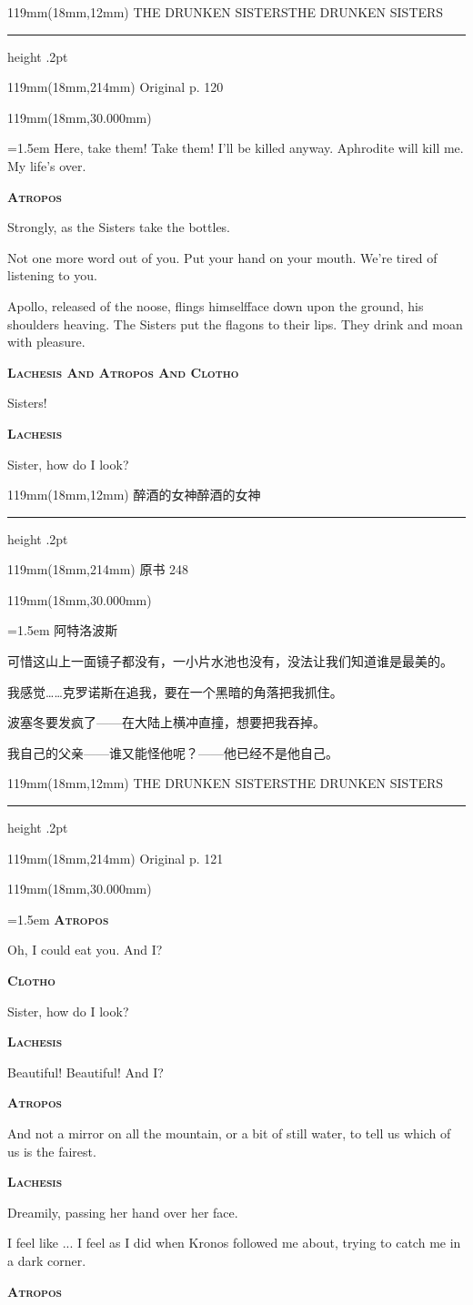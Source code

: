 \documentclass{article}
\newcommand{\ENsetup}{\normalfont\color{ink}\fontsize{11}{16.5}\selectfont\emergencystretch=1.5em}
\newcommand{\ZHsetup}{\normalfont\color{ink}\fontsize{10.5}{17}\selectfont\emergencystretch=1.5em}
\newcommand{\ENspeaker}[1]{{\fontsize{9.8}{13}\selectfont\scshape\bfseries #1}\par\vspace{3pt}}
\newcommand{\ZHspeaker}[1]{{\hei\fontsize{10.3}{13}\selectfont #1}\par\vspace{3pt}}
\newcommand{\Block}[3]{\begin{textblock*}{119mm}(18mm,#1mm){#2 #3\par}\end{textblock*}}
\newcommand{\Heading}[3]{%
  \begin{textblock*}{119mm}(18mm,12mm)
    \color{quiet}\fontsize{7.5}{10}\selectfont
    #1\hfill #2\par\vspace{3mm}\hrule height .2pt
  \end{textblock*}
  \begin{textblock*}{119mm}(18mm,214mm)
    \color{quiet}\fontsize{7}{10}\selectfont #3\hfill\thepage
  \end{textblock*}
}
\begin{document}
\newpage
\null
\Heading{THE DRUNKEN SISTERS}{THE DRUNKEN SISTERS}{Original p. 120}
\Block{30.000}{\ENsetup}{\sloppy
Here, take them! Take them! I'll be killed anyway. Aphrodite will kill me. My life's over.\par\vspace{2pt}
\ENspeaker{Atropos}
Strongly, as the Sisters take the bottles.\par\vspace{2pt}
Not one more word out of you. Put your hand on your mouth. We're tired of listening to you.\par\vspace{2pt}
Apollo, released of the noose, flings himselfface down upon the ground, his shoulders heaving. The Sisters put the flagons to their lips. They drink and moan with pleasure.\par\vspace{2pt}
\ENspeaker{Lachesis And Atropos And Clotho}
Sisters!\par\vspace{2pt}
\ENspeaker{Lachesis}
Sister, how do I look?\par\vspace{2pt}}
\newpage
\null
\Heading{醉酒的女神}{醉酒的女神}{原书 248}
\Block{30.000}{\ZHsetup}{\ZHspeaker{阿特洛波斯}可惜这山上一面镜子都没有，一小片水池也没有，没法让我们知道谁是最美的。\par \vspace{2.2mm}\ZHspeaker{拉刻西斯}{\kai （做梦一般，把手放在自己的脸上）}我感觉……克罗诺斯在追我，要在一个黑暗的角落把我抓住。\par \vspace{2.2mm}\ZHspeaker{阿特洛波斯}波塞冬要发疯了——在大陆上横冲直撞，想要把我吞掉。\par \vspace{2.2mm}\ZHspeaker{克洛托}我自己的父亲——谁又能怪他呢？——他已经不是他自己。\par }
\newpage
\null
\Heading{THE DRUNKEN SISTERS}{THE DRUNKEN SISTERS}{Original p. 121}
\Block{30.000}{\ENsetup}{\sloppy
\ENspeaker{Atropos}
Oh, I could eat you. And I?\par\vspace{2pt}
\ENspeaker{Clotho}
Sister, how do I look?\par\vspace{2pt}
\ENspeaker{Lachesis}
Beautiful! Beautiful! And I?\par\vspace{2pt}
\ENspeaker{Atropos}
And not a mirror on all the mountain, or a bit of still water, to tell us which of us is the fairest.\par\vspace{2pt}
\ENspeaker{Lachesis}
Dreamily, passing her hand over her face.\par\vspace{2pt}
I feel like ... I feel as I did when Kronos followed me about, trying to catch me in a dark corner.\par\vspace{2pt}
\ENspeaker{Atropos}}
\end{document}
